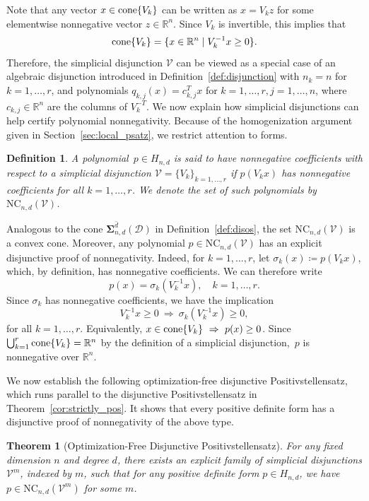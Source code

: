 \documentclass[12pt]{article}
\newcommand{\reals}{\mathbb{R}}
\newcommand{\DiSOS}{\mathbf{\Sigma}}
\newcommand{\DiSOSL}{\text{NC}}
\newcommand{\defeq}{\coloneq}
\newcommand{\cone}{\operatornamewithlimits{cone}}
\newcommand{\mcD}{\mathcal{D}}
\newcommand{\mcV}{\mathcal{V}}
\newtheorem{theorem}{Theorem}%
\newtheorem{definition}{Definition}%
\theoremstyle{remark}
\begin{document}
Note that any vector $x\in\cone\{V_k\}$ can be written as $x=V_kz$ for some elementwise nonnegative vector $z\in\reals^n$. Since $V_k$ is invertible, this implies that $$\cone\{V_k\}=\{x\in\reals^n\mid V_k^{-1}x\ge 0\}.$$ 
Therefore, the simplicial disjunction $\mcV$ can be viewed as a special case of an algebraic disjunction introduced in Definition~\ref{def:disjunction} with $n_k=n$ for $k=1,\ldots,r$, and polynomials $q_{k,j}(x)=c_{k,j}^Tx$ for $k=1,\ldots,r,j=1,\ldots,n$, where $c_{k,j}\in\reals^n$ are the columns of $V_k^{-T}$. 
We now explain how simplicial disjunctions can help certify polynomial nonnegativity. Because of the homogenization argument given in Section~\ref{sec:local_psatz}, we restrict attention to forms.
\begin{definition}\label{def:disos_new}
A polynomial~$p\in H_{n,d}$ is said to \emph{have nonnegative coefficients with respect to a simplicial disjunction} $\mcV=\{V_k\}_{k=1,\ldots,r}$ if $p(V_kx)$ has nonnegative coefficients for all $k=1,\ldots, r$. We denote the set of such polynomials by $\DiSOSL_{n,d}(\mcV)$. 
\end{definition}
Analogous to the cone $\DiSOS_{n,d}^{\bar{d}}(\mcD)$ 
in Definition~\ref{def:disos}, the set $\DiSOSL_{n,d}(\mcV)$ is a convex cone.  
Moreover, any polynomial $p\in\DiSOSL_{n,d}(\mcV)$ has an explicit disjunctive proof of nonnegativity. Indeed, for $k=1,\ldots,r$, let $\sigma_k(x)\defeq p(V_k x)$, which, by definition, has nonnegative coefficients. We can therefore write 
\[p(x)=\sigma_k(V_k^{-1}x),\quad k=1,\ldots,r.\]
Since $\sigma_k$ has nonnegative coefficients, we have the implication
\[V_k^{-1}x\ge 0\ \Rightarrow\ \sigma_k(V_k^{-1}x)\ge 0,\]
for all $k=1,\ldots,r$. Equivalently, $x\in\cone\{V_k\}\ \Rightarrow\ p(x)\ge 0$. Since $\bigcup_{k=1}^r\cone\{V_k\}=\reals^n$ by the definition of a simplicial disjunction,~$p$ is nonnegative over $\reals^n$.

We now establish the following optimization-free disjunctive Positivstellensatz, which runs parallel to the disjunctive Positivstellensatz in Theorem~\ref{cor:strictly_pos}. It shows that every positive definite form has a disjunctive proof of nonnegativity of the above type.
\begin{theorem}[Optimization-Free Disjunctive Positivstellensatz]\label{cor:strictly_pos_new}
For any fixed dimension $n$ and degree $d$, there exists an explicit family of simplicial disjunctions
$\mcV^m$, indexed by $m$, such that for any positive
 definite form $p\in H_{n,d}$, we have $p\in \DiSOSL_{n,d}(\mcV^m)$ for some $m$.
\end{theorem}
\end{document}
